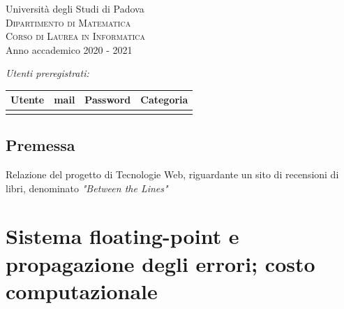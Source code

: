 \documentclass[12pt,a4paper,headings=optiontohead]{scrbook}
\begin{document}
\begin{titlepage}
\vspace{1.5cm}
{\LARGE Università degli Studi di Padova}\\[0.4cm] %
\textsc{\large{Dipartimento di Matematica}}\\[0.05cm]
\textsc{\large{Corso di Laurea in Informatica}}\\[0.5cm]%
{\Large Anno accademico 2020 - 2021}\\ %

\vfill %



\emph{\Large{Utenti preregistrati:}}\\

\renewcommand{\arraystretch}{1.4}
 \begin{center}
 \begin{tabular}{|r|l|l|l|}
 \hline
\textbf{Utente} & \textbf{mail} & \textbf{Password} & \textbf{Categoria}  \\ \hline \hline
 &  &  & \\ \hline

 \end{tabular}
 \end{center}

\end{titlepage}


\begin{center}
\pagebreak

\section*{Premessa}
\begin{minipage}{0.9\textwidth} 
\large{Relazione del progetto di Tecnologie Web, riguardante un sito di recensioni di libri, denominato \textit{"Between the Lines"}}

\end{minipage}

\end{center}
\pagebreak

\tableofcontents

\chapter{Sistema floating-point e propagazione degli errori; costo computazionale}
\end{document}
